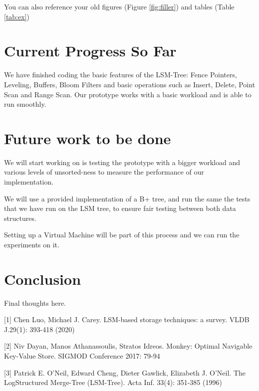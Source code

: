 \documentclass[sigconf]{acmart}
\begin{document}
You can also reference your old figures (Figure \ref{fig:filler}) and tables 
(Table \ref{tab:ex})

\section{Current Progress So Far}

We have finished coding the basic features of the LSM-Tree: Fence Pointers, Leveling, Buffers, Bloom Filters and basic operations such as Insert, Delete, Point Scan and Range Scan. Our prototype works with a basic workload and is able to run smoothly.

\section{Future work to be done}

We will start working on is testing the prototype with a bigger workload and various levels of unsorted-ness to measure the performance of our implementation.


We will use a provided implementation of a B+ tree, and run the same the tests that we have run on the LSM tree, to ensure fair testing between both data structures.

Setting up a Virtual Machine will be part of this process and we can run the experiments on it.

\section{Conclusion}

Final thoughts here.

{
    
    

[1] Chen Luo, Michael J. Carey. LSM-based storage techniques: a survey. VLDB J.29(1): 393-418 (2020)

[2] Niv Dayan, Manos Athanassoulis, Stratos Idreos. Monkey: Optimal Navigable
Key-Value Store. SIGMOD Conference 2017: 79-94

[3] Patrick E. O'Neil, Edward Cheng, Dieter Gawlick, Elizabeth J. O'Neil. The LogStructured Merge-Tree (LSM-Tree). Acta Inf. 33(4): 351-385 (1996)
} 
\end{document}

